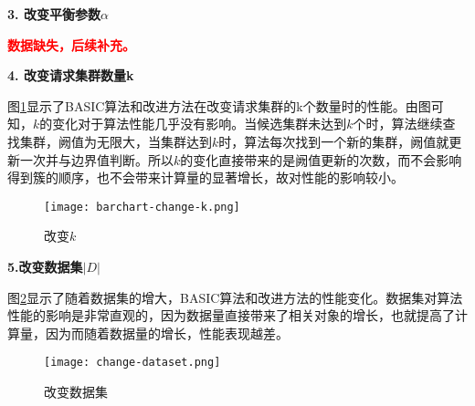 \textbf{3. 改变平衡参数$\alpha$}

\textcolor{red}{\textbf{数据缺失，后续补充。}}

\textbf{4. 改变请求集群数量k}

图\ref{change_k}显示了BASIC算法和改进方法在改变请求集群的k个数量时的性能。由图可知，$k$的变化对于算法性能几乎没有影响。当候选集群未达到$k$个时，算法继续查找集群，阙值为无限大，当集群达到$k$时，算法每次找到一个新的集群，阙值就更新一次并与边界值判断。所以$k$的变化直接带来的是阙值更新的次数，而不会影响得到簇的顺序，也不会带来计算量的显著增长，故对性能的影响较小。 

\begin{figure}[htbp]
  \begin{center}
    \texttt{[image: barchart-change-k.png]}
    \caption{改变$k$}
    \label{change_k}
  \end{center}
\end{figure} 

\textbf{5.改变数据集$\left| D \right|$}

图\ref{change_dataset}显示了随着数据集的增大，BASIC算法和改进方法的性能变化。数据集对算法性能的影响是非常直观的，因为数据量直接带来了相关对象的增长，也就提高了计算量，因为而随着数据量的增长，性能表现越差。

\begin{figure}[htbp]
  \begin{center}
    \texttt{[image: change-dataset.png]}
    \caption{改变数据集}
    \label{change_dataset}
  \end{center}
\end{figure} 

